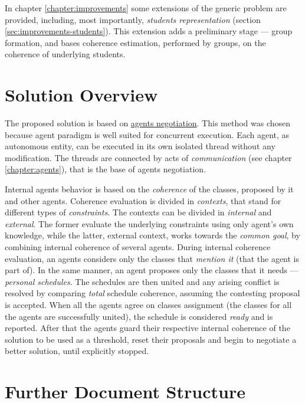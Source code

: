 \documentclass[header]{subfiles}
\begin{document}
\noindent
In chapter \ref{chapter:improvements} some extensions of the generic problem
are provided, including, most importantly, \emph{students representation}
(section \ref{sec:improvements-students}). This extension adds a preliminary
stage --- group formation, and bases coherence estimation, performed by groups,
on the coherence of underlying students.

\section{Solution Overview}
The proposed solution is based on \underline{agents negotiation}.
This method was chosen because agent paradigm is well suited for concurrent
execution. Each agent, as autonomous entity, can be executed in its own
isolated thread without any modification. The threads are connected by acts of
\emph{communication} (see chapter \ref{chapter:agents}), that is the base of
agents negotiation.

Internal agents behavior is based on the \emph{coherence} of the classes,
proposed by it and other agents. Coherence evaluation is divided in \emph{contexts},
that stand for different types of \emph{constraints}. The contexts can be divided
in \emph{internal} and \emph{external}. The former evaluate the underlying
constraints using only agent's own knowledge, while the latter, external context,
works towards the \emph{common goal}, by combining internal coherence of several
agents.
During internal coherence evaluation, an agents considers only the
classes that \emph{mention it} (that the agent is part of). In the same manner,
an agent proposes only the classes that it needs --- \emph{personal schedules}.
The schedules are then united and any arising conflict is resolved by comparing
\emph{total} schedule coherence, assuming the contesting proposal is accepted.
When all the agents agree on classes assignment (the classes for all the agents
are successfully united), the schedule is considered \emph{ready} and is reported.
After that the agents guard their respective internal coherence of the solution
to be used as a threshold, reset their proposals and begin to negotiate a better
solution, until explicitly stopped.


\section{Further Document Structure}
\end{document}
